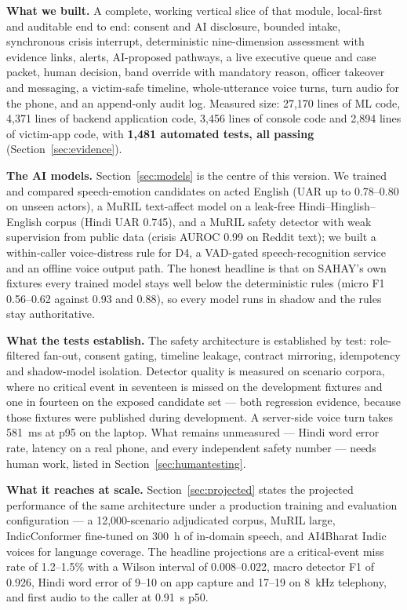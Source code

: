 \documentclass[11pt,a4paper]{article}
\begin{document}
\textbf{What we built.} A complete, working vertical slice of that module, local-first and
auditable end to end: consent and AI disclosure, bounded intake, synchronous crisis interrupt,
deterministic nine-dimension assessment with evidence links, alerts, AI-proposed pathways, a live
executive queue and case packet, human decision, band override with mandatory reason, officer
takeover and messaging, a victim-safe timeline, whole-utterance voice turns, turn audio for the
phone, and an append-only audit log. Measured size: 27{,}170 lines of ML code, 4{,}371 lines of
backend application code, 3{,}456 lines of console code and 2{,}894 lines of victim-app code, with
\textbf{1{,}481 automated tests, all passing} (Section~\ref{sec:evidence}).

\textbf{The AI models.} Section~\ref{sec:models} is the centre of this version. We trained and
compared speech-emotion candidates on acted English (UAR up to 0.78--0.80 on unseen actors), a MuRIL
text-affect model on a leak-free Hindi--Hinglish--English corpus (Hindi UAR 0.745), and a MuRIL
safety detector with weak supervision from public data (crisis AUROC 0.99 on Reddit text); we built a
within-caller voice-distress rule for D4, a VAD-gated speech-recognition service and an offline voice
output path. The honest headline is that on SAHAY's own fixtures every trained model stays well below
the deterministic rules (micro F1 0.56--0.62 against 0.93 and 0.88), so every model runs in shadow and
the rules stay authoritative.

\textbf{What the tests establish.} The safety architecture is established by test: role-filtered
fan-out, consent gating, timeline leakage, contract mirroring, idempotency and shadow-model
isolation. Detector quality is measured on scenario corpora, where no critical event in seventeen is
missed on the development fixtures and one in fourteen on the exposed candidate set --- both
regression evidence, because those fixtures were published during development. A server-side voice
turn takes 581~ms at p95 on the laptop. What remains unmeasured --- Hindi word error rate, latency on
a real phone, and every independent safety number --- needs human work, listed in
Section~\ref{sec:humantesting}.

\textbf{What it reaches at scale.} Section~\ref{sec:projected} states the projected performance of
the same architecture under a production training and evaluation configuration --- a 12{,}000-scenario
adjudicated corpus, MuRIL large, IndicConformer fine-tuned on 300~h of in-domain speech, and AI4Bharat
Indic voices for language coverage. The headline projections are a critical-event miss rate of
1.2--1.5\% with a Wilson interval of 0.008--0.022, macro detector F1 of 0.926, Hindi word error of
9--10 on app capture and 17--19 on 8~kHz telephony, and first audio to the caller at 0.91~s p50.
\end{document}
